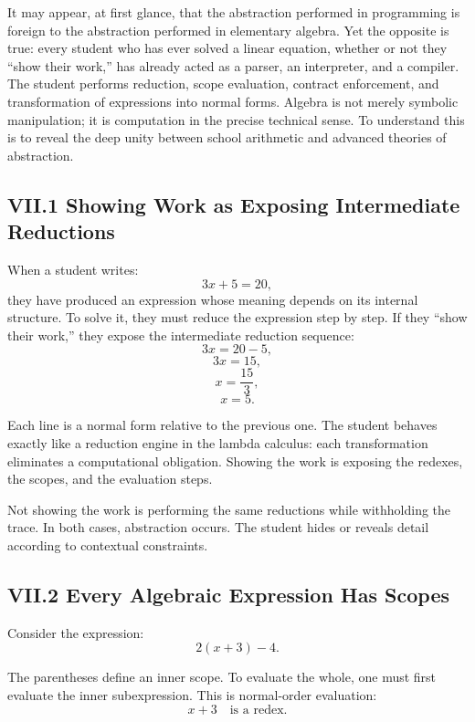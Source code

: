 \documentclass[12pt,letterpaper]{article}
\begin{document}
It may appear, at first glance, that the abstraction performed in programming is foreign to the abstraction performed in elementary algebra. Yet the opposite is true: every student who has ever solved a linear equation, whether or not they ``show their work,'' has already acted as a parser, an interpreter, and a compiler. The student performs reduction, scope evaluation, contract enforcement, and transformation of expressions into normal forms. Algebra is not merely symbolic manipulation; it is computation in the precise technical sense. To understand this is to reveal the deep unity between school arithmetic and advanced theories of abstraction.

\subsection{VII.1 Showing Work as Exposing Intermediate Reductions}

When a student writes:
\[
3x + 5 = 20,
\]
they have produced an expression whose meaning depends on its internal structure. To solve it, they must reduce the expression step by step. If they ``show their work,'' they expose the intermediate reduction sequence:
\[
3x = 20 - 5,
\]
\[
3x = 15,
\]
\[
x = \frac{15}{3},
\]
\[
x = 5.
\]

Each line is a normal form relative to the previous one. The student behaves exactly like a reduction engine in the lambda calculus: each transformation eliminates a computational obligation. Showing the work is exposing the redexes, the scopes, and the evaluation steps.

Not showing the work is performing the same reductions while withholding the trace. In both cases, abstraction occurs. The student hides or reveals detail according to contextual constraints.

\subsection{VII.2 Every Algebraic Expression Has Scopes}

Consider the expression:
\[
2(x + 3) - 4.
\]

The parentheses define an inner scope. To evaluate the whole, one must first evaluate the inner subexpression. This is normal-order evaluation:
\[
x + 3 \quad \text{is a redex.}
\]
\end{document}

